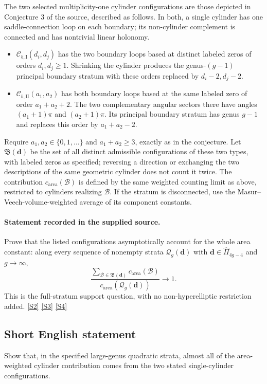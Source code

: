 \documentclass[11pt]{article}
\newcommand{\sref}[2]{\hyperlink{source:#1:#2}{[S#2]}}
\begin{document}
The two selected multiplicity-one cylinder configurations are those depicted in Conjecture 3 of the source, described as follows. In both, a single cylinder has one saddle-connection loop on each boundary; its non-cylinder complement is connected and has nontrivial linear holonomy.
\begin{itemize}
\item $\mathcal C_{b,\mathrm I}(d_i,d_j)$ has the two boundary loops based at distinct labeled zeros of orders $d_i,d_j\ge1$. Shrinking the cylinder produces the genus-$(g-1)$ principal boundary stratum with these orders replaced by $d_i-2,d_j-2$.
\item $\mathcal C_{b,\mathrm{II}}(a_1,a_2)$ has both boundary loops based at the same labeled zero of order $a_1+a_2+2$. The two complementary angular sectors there have angles $(a_1+1)\pi$ and $(a_2+1)\pi$. Its principal boundary stratum has genus $g-1$ and replaces this order by $a_1+a_2-2$.
\end{itemize}
Require $a_1,a_2\in\{0,1,\ldots\}$ and $a_1+a_2\ge3$, exactly as in the conjecture. Let $\mathfrak B(\boldsymbol d)$ be the set of all distinct admissible configurations of these two types, with labeled zeros as specified; reversing a direction or exchanging the two descriptions of the same geometric cylinder does not count it twice. The contribution $c_{\mathrm{area}}(\mathcal B)$ is defined by the same weighted counting limit as above, restricted to cylinders realizing $\mathcal B$. If the stratum is disconnected, use the Masur--Veech-volume-weighted average of its component constants.
\paragraph{Statement recorded in the supplied source.}
Prove that the listed configurations asymptotically account for the whole area constant: along every sequence of nonempty strata $\mathcal Q_g(\boldsymbol d)$ with $\boldsymbol d\in\widehat\Pi_{4g-4}$ and $g\to\infty$,
\[
 \frac{\displaystyle\sum_{\mathcal B\in\mathfrak B(\boldsymbol d)}c_{\mathrm{area}}(\mathcal B)}
 {c_{\mathrm{area}}(\mathcal Q_g(\boldsymbol d))}\longrightarrow1.
\]
This is the full-stratum support question, with no non-hyperelliptic restriction added. \sref{3600003}{2} \sref{3600003}{3} \sref{3600003}{4}
\subsection{Short English statement}
Show that, in the specified large-genus quadratic strata, almost all of the area-weighted cylinder contribution comes from the two stated single-cylinder configurations.
\end{document}

